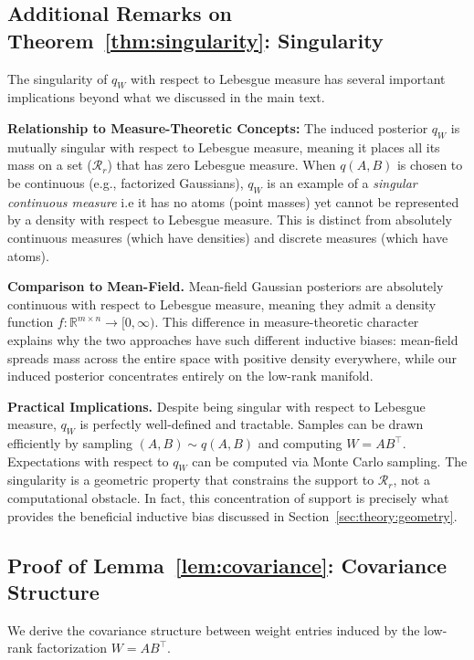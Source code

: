 \documentclass{article}
\theoremstyle{plain}
\theoremstyle{definition}
\theoremstyle{remark}
\begin{document}
\subsection{Additional Remarks on Theorem~\ref{thm:singularity}: Singularity}\label{app:singularity}

The singularity of $q_W$ with respect to Lebesgue measure has several important implications beyond what we discussed in the main text.

\textbf{Relationship to Measure-Theoretic Concepts:} The induced posterior $q_W$ 
is mutually singular with respect to Lebesgue measure, meaning it places all its 
mass on a set ($\mathcal{R}_r$) that has zero Lebesgue measure. When $q(A,B)$ 
is chosen to be continuous (e.g., factorized Gaussians), $q_W$ is an example of 
a \emph{singular continuous measure}  i.e it has no atoms (point masses) yet cannot 
be represented by a density with respect to Lebesgue measure. This is distinct 
from absolutely continuous measures (which have densities) and discrete measures 
(which have atoms).

\textbf{Comparison to Mean-Field.} Mean-field Gaussian posteriors are absolutely continuous with respect to Lebesgue measure, meaning they admit a density function $f : \mathbb{R}^{m \times n} \rightarrow [0,\infty)$. This difference in measure-theoretic character explains why the two approaches have such different inductive biases: mean-field spreads mass across the entire space with positive density everywhere, while our induced posterior concentrates entirely on the low-rank manifold.

\textbf{Practical Implications.} Despite being singular with respect to Lebesgue measure, $q_W$ is perfectly well-defined and tractable. Samples can be drawn efficiently by sampling $(A,B) \sim q(A,B)$ and computing $W = AB^\top$. Expectations with respect to $q_W$ can be computed via Monte Carlo sampling. The singularity is a geometric property that constrains the support to $\mathcal{R}_r$, not a computational obstacle. In fact, this concentration of support is precisely what provides the beneficial inductive bias discussed in Section~\ref{sec:theory:geometry}.

\subsection{Proof of Lemma~\ref{lem:covariance}: Covariance Structure}\label{app:corrproof}

We derive the covariance structure between weight entries induced by the low-rank factorization $W = AB^\top$.
\end{document}
